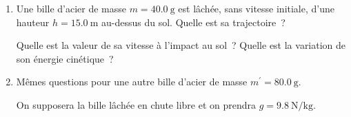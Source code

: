 \begin{enumerate}
    \item Une bille d'acier de masse $m=\qty{40.0}{\g}$ est lâchée, sans vitesse
          initiale, d'une hauteur $h=\qty{15.0}{\m}$ au-dessus du sol. Quelle
          est sa trajectoire~?
        
          Quelle est la valeur de sa vitesse à l'impact au sol~? Quelle est la
          variation de son énergie cinétique~?
    \item Mêmes questions pour une autre bille d'acier de masse
          $m^{\prime}=\qty{80.0}{\g}$.
    
          On supposera la bille lâchée en chute libre et on prendra
          $g=\qty{9.8}{\N\per\kg}$.
\end{enumerate}

